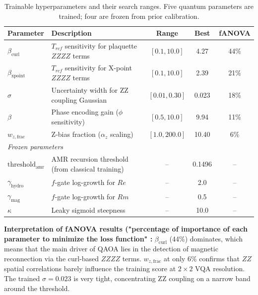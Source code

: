 \documentclass[12pt, a4paper, oneside]{report}
\begin{document}
\begin{table}[H]
\centering
\caption{Trainable hyperparameters and their search ranges. Five quantum parameters are trained; four are frozen from prior calibration.}
\label{tab:hyperparams}
\begin{tabular}{llccc}
\toprule
\textbf{Parameter} & \textbf{Description} & \textbf{Range} & \textbf{Best} & \textbf{fANOVA} \\
\midrule
$\beta_{\text{curl}}$    & $T_{rcf}$ sensitivity for plaquette $ZZZZ$ terms & $[0.1, 10.0]$  & 4.27 & 44\% \\
$\beta_{\text{xpoint}}$  & $T_{rcf}$ sensitivity for X-point $ZZZZ$ terms   & $[0.1, 10.0]$  & 2.39 & 21\% \\
$\sigma$                 & Uncertainty width for ZZ coupling Gaussian        & $[0.01, 0.30]$ & 0.023 & 18\% \\
$\beta$                  & Phase encoding gain ($\phi$ sensitivity)           & $[0.5, 10.0]$  & 9.94 & 11\% \\
$w_{z,\text{frac}}$      & Z-bias fraction ($\alpha_z$ scaling)               & $[1.0, 200.0]$ & 10.40 & 6\% \\
\midrule
\multicolumn{5}{l}{\textit{Frozen parameters}} \\
$\text{threshold}_{\text{amr}}$ & AMR recursion threshold (from classical training) & -- & 0.1496 & -- \\
$\gamma_{\text{hydro}}$  & $f$-gate log-growth for $Re$                      & -- & 2.0 & -- \\
$\gamma_{\text{mag}}$    & $f$-gate log-growth for $Rm$                      & -- & 0.5 & -- \\
$\kappa$                 & Leaky sigmoid steepness                            & -- & 10.0 & -- \\
\bottomrule
\end{tabular}
\end{table}

\textbf{Interpretation of fANOVA results ("percentage of importance of each parameter to minimize the loss function" :} $\beta_{\text{curl}}$ (44\%) dominates, which means that the main driver of QAOA lies in the detection of magnetic reconnection via the curl-based $ZZZZ$ terms. $w_{z,\text{frac}}$ at only 6\% confirms that $ZZ$ spatial correlations barely influence the training score at $2\times 2$ VQA resolution. The trained $\sigma = 0.023$ is very tight, concentrating ZZ coupling on a narrow band around the threshold.

\end{document}
